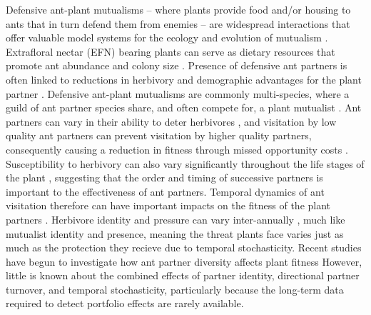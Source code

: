\documentclass[11pt]{article}
\begin{document}
Defensive ant-plant mutualisms -- where plants provide food and/or housing to ants that in turn defend them from enemies -- are widespread interactions that offer valuable model systems for the ecology and evolution of mutualism \citep{Bronstein1998, Bronstein2006}. 
Extrafloral nectar (EFN) bearing plants can serve as dietary resources that promote ant abundance and colony size \citep{Byk2011, Ness2009, Ness2006}.
Presence of defensive ant partners is often linked to reductions in herbivory  \citep{Trager2010, Rudgers2004} and demographic advantages for the plant partner \citep{Baez2016}.
Defensive ant-plant mutualisms are commonly multi-species, where a guild of ant partner species share, and often compete for, a plant mutualist \citep{Bronstein1998, Beattie1985, Trager2010, Agrawal1998}.
Ant partners can vary in their ability to deter herbivores \citep{Bruna2014}, and visitation by low quality ant partners can prevent visitation by higher quality partners, consequently causing a reduction in fitness through missed opportunity costs \citep{Fraser2001, Frederickson2005}.
Susceptibility to herbivory can also vary significantly throughout the life stages of the plant \citep{Boege2005}, suggesting that the order and timing of successive partners is important to the effectiveness of ant partners.
Temporal dynamics of ant visitation therefore can have important impacts on the fitness of the plant partners \citep{Barton2010, Boege2005, Fonseca2003}.
Herbivore identity and pressure can vary inter-annually \cite{Wetzel2023}, much like mutualist identity and presence, meaning the threat plants face varies just as much as the protection they recieve due to temporal stochasticity. 
Recent studies have begun to investigate how ant partner diversity affects plant fitness \citep{Palmer2010,Afkhami2014,Fiala1994,Gaume1998,Dattilo2014,Ludka2015}
However, little is known about the combined effects of partner identity, directional partner turnover, and temporal stochasticity, particularly because the long-term data required to detect portfolio effects are rarely available. 
	
\end{document}
